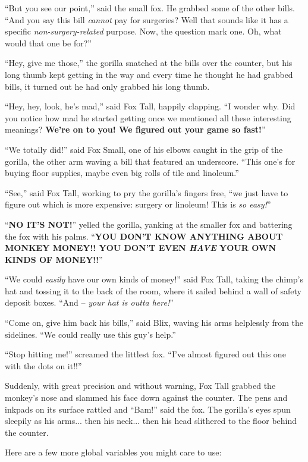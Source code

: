 \documentclass[12pt,twoside]{report}
\begin{document}
``But you see our point,'' said the small fox.  He grabbed some of the
other bills. ``And you say this bill {\em cannot} pay for surgeries?
Well that sounds like it has a specific {\em non-surgery-related}
purpose.  Now, the question mark one.  Oh, what would that one be
for?''

``Hey, give me those,'' the gorilla snatched at the bills over the
counter, but his long thumb kept getting in the way and every time he
thought he had grabbed bills, it turned out he had only grabbed his
long thumb.

``Hey, hey, look, he's mad,'' said Fox Tall, happily clapping.  ``I
wonder why.  Did you notice how mad he started getting once we
mentioned all these interesting meanings?  {\bf We're on to you!  We
  figured out your game so fast!}''

``We totally did!'' said Fox Small, one of his elbows caught in the
grip of the gorilla, the other arm waving a bill that featured an
underscore. ``This one's for buying floor supplies, maybe even big
rolls of tile and linoleum.''

``See,'' said Fox Tall, working to pry the gorilla's fingers free,
``we just have to figure out which is more expensive: surgery or
linoleum!  This is {\em so easy!}''

``{\bf NO IT'S NOT!}'' yelled the gorilla, yanking at the smaller fox
and battering the fox with his palms.  ``{\bf YOU DON'T KNOW ANYTHING
  ABOUT MONKEY MONEY!!  YOU DON'T EVEN {\em HAVE} YOUR OWN KINDS OF
  MONEY!!}''

``We could {\em easily} have our own kinds of money!'' said Fox Tall,
taking the chimp's hat and tossing it to the back of the room, where
it sailed behind a wall of safety deposit boxes.  ``And -- {\em your
  hat is outta here!}''

``Come on, give him back his bills,'' said Blix, waving his arms
helplessly from the sidelines.  ``We could really use this guy's
help.''

``Stop hitting me!'' screamed the littlest fox.  ``I've almost figured
out this one with the dots on it!!''

Suddenly, with great precision and without warning, Fox Tall grabbed
the monkey's nose and slammed his face down against the counter.  The
pens and inkpads on its surface rattled and ``Bam!'' said the fox.
The gorilla's eyes spun sleepily as his arms... then his neck... then
his head slithered to the floor behind the counter.

Here are a few more global variables you might care to use:
\end{document}
